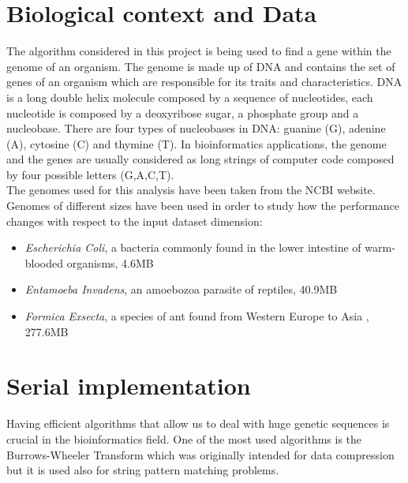 \documentclass[final,5p,times,twocolumn,authoryear]{elsarticle}
\begin{document}
\section{Biological context and Data}
\label{Biological context and Data}
The algorithm considered in this project is being used to find a gene within the genome of an organism. The genome is made up of DNA and contains the set of genes of an organism which are responsible for its traits and characteristics.
DNA is a long double helix molecule composed by a sequence of nucleotides, each nucleotide is composed by a deoxyribose sugar, a phosphate group and a nucleobase\cite{nucleotide}. There are four types of nucleobases in DNA: guanine (G), adenine (A), cytosine (C) and thymine (T).
In bioinformatics applications, the genome and the genes are usually considered as long strings of computer code composed by four possible letters (G,A,C,T). \\
The genomes used for this analysis have been taken from the NCBI website\cite{ncbi}. \\
Genomes of different sizes have been used in order to study how the performance changes with respect to the input dataset dimension:
\begin{itemize}
   \item \emph{Escherichia Coli}, a bacteria commonly found in the lower intestine of warm-blooded organisms\cite{ecoli}, 4.6MB \cite{ecoli dataset}
   \item \emph{Entamoeba Invadens}, an amoebozoa parasite of reptiles\cite{entamoeba}, 40.9MB \cite{entamoeba dataset}
   \item \emph{Formica Exsecta}, a species of ant found from Western Europe to Asia \cite{formica}, 277.6MB \cite{formica dataset}
\end{itemize}


\section{Serial implementation}
Having efficient algorithms that allow us to deal with huge genetic sequences is crucial in the bioinformatics field. One of the most used algorithms is the Burrows-Wheeler Transform which was originally intended for data compression but it is used also for string pattern matching problems.
\end{document}
